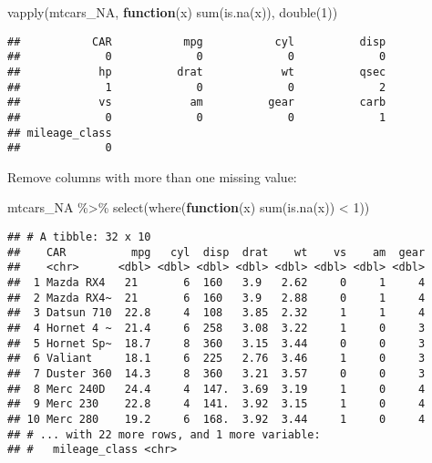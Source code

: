 \documentclass[
]{book}
\newenvironment{Shaded}{\begin{snugshade}}{\end{snugshade}}
\newcommand{\ControlFlowTok}[1]{\textcolor[rgb]{0.13,0.29,0.53}{\textbf{#1}}}
\newcommand{\DecValTok}[1]{\textcolor[rgb]{0.00,0.00,0.81}{#1}}
\newcommand{\FunctionTok}[1]{\textcolor[rgb]{0.00,0.00,0.00}{#1}}
\newcommand{\NormalTok}[1]{#1}
\newcommand{\SpecialCharTok}[1]{\textcolor[rgb]{0.00,0.00,0.00}{#1}}
\begin{document}
\begin{Shaded}
\begin{Highlighting}[]
\FunctionTok{vapply}\NormalTok{(mtcars\_NA, }\ControlFlowTok{function}\NormalTok{(x) }\FunctionTok{sum}\NormalTok{(}\FunctionTok{is.na}\NormalTok{(x)), }\FunctionTok{double}\NormalTok{(}\DecValTok{1}\NormalTok{))}
\end{Highlighting}
\end{Shaded}

\begin{verbatim}
##           CAR           mpg           cyl          disp 
##             0             0             0             0 
##            hp          drat            wt          qsec 
##             1             0             0             2 
##            vs            am          gear          carb 
##             0             0             0             1 
## mileage_class 
##             0
\end{verbatim}

Remove columns with more than one missing value:

\begin{Shaded}
\begin{Highlighting}[]
\NormalTok{mtcars\_NA }\SpecialCharTok{\%\textgreater{}\%} \FunctionTok{select}\NormalTok{(}\FunctionTok{where}\NormalTok{(}\ControlFlowTok{function}\NormalTok{(x) }\FunctionTok{sum}\NormalTok{(}\FunctionTok{is.na}\NormalTok{(x)) }\SpecialCharTok{\textless{}} \DecValTok{1}\NormalTok{))}
\end{Highlighting}
\end{Shaded}

\begin{verbatim}
## # A tibble: 32 x 10
##    CAR          mpg   cyl  disp  drat    wt    vs    am  gear
##    <chr>      <dbl> <dbl> <dbl> <dbl> <dbl> <dbl> <dbl> <dbl>
##  1 Mazda RX4   21       6  160   3.9   2.62     0     1     4
##  2 Mazda RX4~  21       6  160   3.9   2.88     0     1     4
##  3 Datsun 710  22.8     4  108   3.85  2.32     1     1     4
##  4 Hornet 4 ~  21.4     6  258   3.08  3.22     1     0     3
##  5 Hornet Sp~  18.7     8  360   3.15  3.44     0     0     3
##  6 Valiant     18.1     6  225   2.76  3.46     1     0     3
##  7 Duster 360  14.3     8  360   3.21  3.57     0     0     3
##  8 Merc 240D   24.4     4  147.  3.69  3.19     1     0     4
##  9 Merc 230    22.8     4  141.  3.92  3.15     1     0     4
## 10 Merc 280    19.2     6  168.  3.92  3.44     1     0     4
## # ... with 22 more rows, and 1 more variable:
## #   mileage_class <chr>
\end{verbatim}
\end{document}
